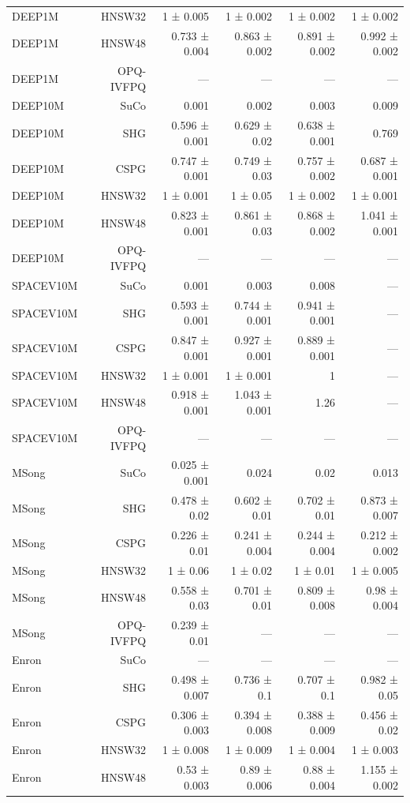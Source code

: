\begin{table}[t]
\begin{tabular}{lrrrrr}
DEEP1M & HNSW32 & 1 ± 0.005 & 1 ± 0.002 & 1 ± 0.002 & 1 ± 0.002 \\
DEEP1M & HNSW48 & 0.733 ± 0.004 & 0.863 ± 0.002 & 0.891 ± 0.002 & 0.992 ± 0.002 \\
DEEP1M & OPQ-IVFPQ & — & — & — & — \\
DEEP10M & SuCo & 0.001 & 0.002 & 0.003 & 0.009 \\
DEEP10M & SHG & 0.596 ± 0.001 & 0.629 ± 0.02 & 0.638 ± 0.001 & 0.769 \\
DEEP10M & CSPG & 0.747 ± 0.001 & 0.749 ± 0.03 & 0.757 ± 0.002 & 0.687 ± 0.001 \\
DEEP10M & HNSW32 & 1 ± 0.001 & 1 ± 0.05 & 1 ± 0.002 & 1 ± 0.001 \\
DEEP10M & HNSW48 & 0.823 ± 0.001 & 0.861 ± 0.03 & 0.868 ± 0.002 & 1.041 ± 0.001 \\
DEEP10M & OPQ-IVFPQ & — & — & — & — \\
SPACEV10M & SuCo & 0.001 & 0.003 & 0.008 & — \\
SPACEV10M & SHG & 0.593 ± 0.001 & 0.744 ± 0.001 & 0.941 ± 0.001 & — \\
SPACEV10M & CSPG & 0.847 ± 0.001 & 0.927 ± 0.001 & 0.889 ± 0.001 & — \\
SPACEV10M & HNSW32 & 1 ± 0.001 & 1 ± 0.001 & 1 & — \\
SPACEV10M & HNSW48 & 0.918 ± 0.001 & 1.043 ± 0.001 & 1.26 & — \\
SPACEV10M & OPQ-IVFPQ & — & — & — & — \\
MSong & SuCo & 0.025 ± 0.001 & 0.024 & 0.02 & 0.013 \\
MSong & SHG & 0.478 ± 0.02 & 0.602 ± 0.01 & 0.702 ± 0.01 & 0.873 ± 0.007 \\
MSong & CSPG & 0.226 ± 0.01 & 0.241 ± 0.004 & 0.244 ± 0.004 & 0.212 ± 0.002 \\
MSong & HNSW32 & 1 ± 0.06 & 1 ± 0.02 & 1 ± 0.01 & 1 ± 0.005 \\
MSong & HNSW48 & 0.558 ± 0.03 & 0.701 ± 0.01 & 0.809 ± 0.008 & 0.98 ± 0.004 \\
MSong & OPQ-IVFPQ & 0.239 ± 0.01 & — & — & — \\
Enron & SuCo & — & — & — & — \\
Enron & SHG & 0.498 ± 0.007 & 0.736 ± 0.1 & 0.707 ± 0.1 & 0.982 ± 0.05 \\
Enron & CSPG & 0.306 ± 0.003 & 0.394 ± 0.008 & 0.388 ± 0.009 & 0.456 ± 0.02 \\
Enron & HNSW32 & 1 ± 0.008 & 1 ± 0.009 & 1 ± 0.004 & 1 ± 0.003 \\
Enron & HNSW48 & 0.53 ± 0.003 & 0.89 ± 0.006 & 0.88 ± 0.004 & 1.155 ± 0.002 \\

\end{tabular}
\end{table}
